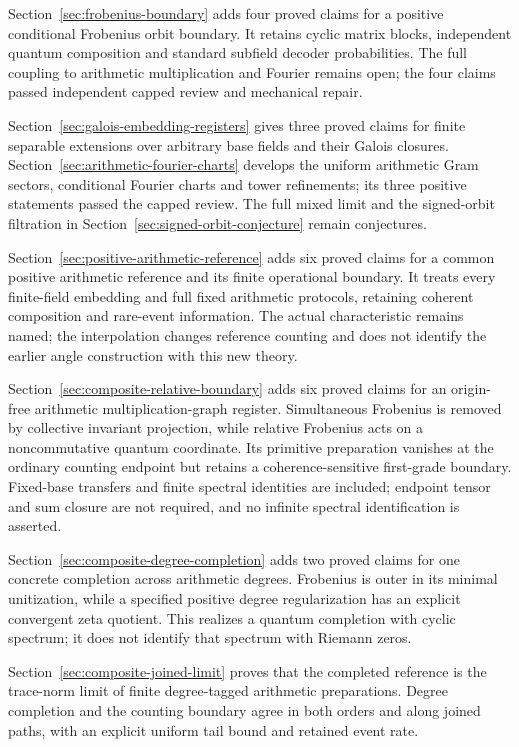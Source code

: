 Section~\ref{sec:frobenius-boundary} adds four proved claims for a positive
conditional Frobenius orbit boundary. It retains cyclic matrix blocks,
independent quantum composition and standard subfield decoder probabilities.
The full coupling to arithmetic multiplication and Fourier remains open;
the four claims passed independent capped review and mechanical repair.

Section~\ref{sec:galois-embedding-registers} gives three proved claims for
finite separable extensions over arbitrary base fields and their Galois
closures. Section~\ref{sec:arithmetic-fourier-charts} develops the uniform
arithmetic Gram sectors, conditional Fourier charts and tower refinements;
its three positive statements passed the capped review. The full mixed limit and
the signed-orbit filtration in Section~\ref{sec:signed-orbit-conjecture}
remain conjectures.

Section~\ref{sec:positive-arithmetic-reference} adds six proved claims for
a common positive arithmetic reference and its finite operational boundary.
It treats every finite-field embedding and full fixed arithmetic protocols,
retaining coherent composition and rare-event information. The actual
characteristic remains named; the interpolation changes reference counting
and does not identify the earlier angle construction with this new theory.

Section~\ref{sec:composite-relative-boundary} adds six proved claims for
an origin-free arithmetic multiplication-graph register. Simultaneous
Frobenius is removed by collective invariant projection, while relative
Frobenius acts on a noncommutative quantum coordinate. Its primitive
preparation vanishes at the ordinary counting endpoint but retains a
coherence-sensitive first-grade boundary. Fixed-base transfers and finite
spectral identities are included; endpoint tensor and sum closure are not
required, and no infinite spectral identification is asserted.

Section~\ref{sec:composite-degree-completion} adds two proved claims for
one concrete completion across arithmetic degrees. Frobenius is outer in
its minimal unitization, while a specified positive degree regularization
has an explicit convergent zeta quotient. This realizes a quantum completion
with cyclic spectrum; it does not identify that spectrum with Riemann zeros.

Section~\ref{sec:composite-joined-limit} proves that the completed reference
is the trace-norm limit of finite degree-tagged arithmetic preparations.
Degree completion and the counting boundary agree in both orders and along
joined paths, with an explicit uniform tail bound and retained event rate.

